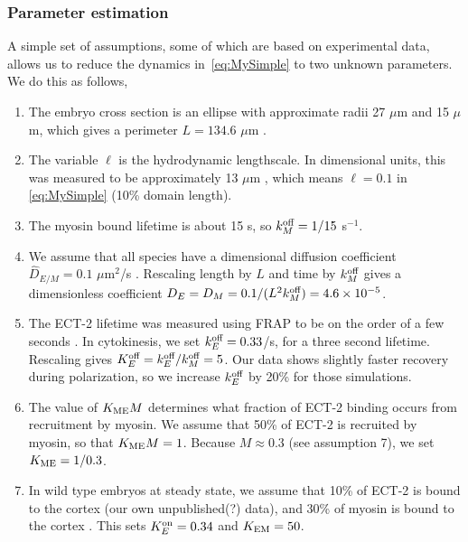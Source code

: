 \documentclass[11pt]{article}
\begin{document}
\begin{appendix}
\subsubsection{Parameter estimation}
A simple set of assumptions, some of which are based on experimental data, allows us to reduce the dynamics in\ \eqref{eq:MySimple} to two unknown parameters. We do this as follows, 
\begin{enumerate}
\item The embryo cross section is an ellipse with approximate radii 27 $\mu$m and 15 $\mu$m, which gives a perimeter $L=134.6$ $\mu$m \citep{goehring2011polarization} .
\item The variable $\ell$ is the hydrodynamic lengthscale. In dimensional units, this was measured to be approximately 13 $\mu$m \citep{mayer2010anisotropies}, which means $\ell = 0.1$ in \eqref{eq:MySimple} (10\% domain length).  
\item The myosin bound lifetime is about 15 s, so $k^\text{off}_M=1/15$ s$^{-1}$.
\item We assume that all species have a dimensional diffusion coefficient $\hat D_{E/M}=0.1$ $\mu$m$^2$/s \citep{goehring2011polarization, gross2019guiding, robin2014single}. Rescaling length by $L$ and time by $k^\text{off}_M$ gives a dimensionless coefficient $D_E=D_M=0.1/(L^2 k^\text{off}_M)=4.6 \times 10^{-5}$. 
\item The ECT-2 lifetime was measured using FRAP to be on the order of a few seconds \citep[Fig.~3D]{longhini2022aurora}. In cytokinesis, we set $k^\text{off}_E=0.33$/s, for a three second lifetime. Rescaling gives $K^\text{off}_E=k^\text{off}_E/k^\text{off}_M=5$. Our data shows slightly faster recovery during polarization, so we increase $k^\text{off}_E$ by 20\% for those simulations.
\item The value of $K_\text{ME} M$ determines what fraction of ECT-2 binding occurs from recruitment by myosin. We assume that 50\% of ECT-2 is recruited by myosin, so that $K_\text{ME} M = 1$. Because $M \approx 0.3$ (see assumption 7), we set $K_\text{ME}=1/0.3$. 
\item In wild type embryos at steady state, we assume that 10\% of ECT-2 is bound to the cortex (our own unpublished(?) data), and 30\% of myosin is bound to the cortex \citep[Fig.~S3j]{gross2019guiding}. This sets $K^\text{on}_E=0.34$ and $K_\text{EM} = 50$. 

\end{enumerate}
\end{appendix}
\end{document}
